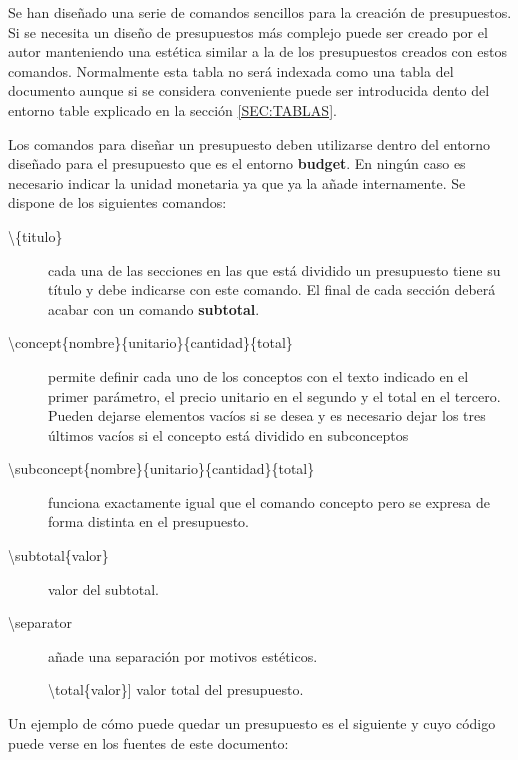 Se han diseñado una serie de comandos sencillos para la creación de presupuestos. Si se necesita un diseño de presupuestos más complejo puede ser creado por el autor manteniendo una estética similar a la de los presupuestos creados con estos comandos. Normalmente esta tabla no será indexada como una tabla del documento aunque si se considera conveniente puede ser introducida dento del entorno table explicado en la sección \ref{SEC:TABLAS}.

Los comandos para diseñar un presupuesto deben utilizarse dentro del entorno diseñado para el presupuesto que es el entorno \textbf{budget}. En ningún caso es necesario indicar la unidad monetaria ya que ya la añade internamente. Se dispone de los siguientes comandos:
  \begin{description}
    \item[{\textbackslash}\{titulo\}] cada una de las secciones en las que está dividido un presupuesto tiene su título y debe indicarse con este comando. El final de cada sección deberá acabar con un comando \textbf{subtotal}.
    \item[{\textbackslash}concept\{nombre\}\{unitario\}\{cantidad\}\{total\}] permite definir cada uno de los conceptos con el texto indicado en el primer parámetro, el precio unitario en el segundo y el total en el tercero. Pueden dejarse elementos vacíos si se desea y es necesario dejar los tres últimos vacíos si el concepto está dividido en subconceptos
    \item[{\textbackslash}subconcept\{nombre\}\{unitario\}\{cantidad\}\{total\}] funciona exactamente igual que el comando concepto pero se expresa de forma distinta en el presupuesto.
    \item[{\textbackslash}subtotal\{valor\}] valor del subtotal.
    \item[{\textbackslash}separator] añade una separación por motivos estéticos.
    \item[]{\textbackslash}total\{valor\}] valor total del presupuesto.
  \end{description}

Un ejemplo de cómo puede quedar un presupuesto es el siguiente y cuyo código puede verse en los fuentes de este documento:

\begin{budget}
  \separator
  \separator
\end{budget}

